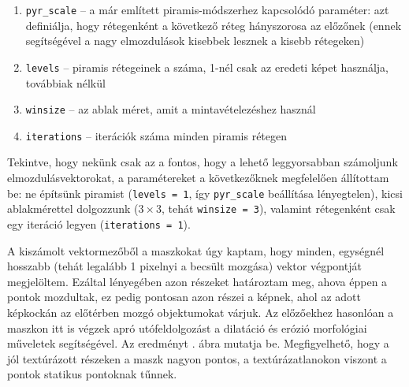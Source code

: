 \begin{enumerate}
\item \texttt{pyr\_scale} -- a már említett piramis-módszerhez kapcsolódó paraméter: azt definiálja, hogy rétegenként a következő réteg hányszorosa az előzőnek (ennek segítségével a nagy elmozdulások kisebbek lesznek a kisebb rétegeken)
\item \texttt{levels} -- piramis rétegeinek a száma, 1-nél csak az eredeti képet használja, továbbiak nélkül
\item \texttt{winsize} -- az ablak méret, amit a mintavételezéshez használ
\item \texttt{iterations} -- iterációk száma minden piramis rétegen
\end{enumerate}

Tekintve, hogy nekünk csak az a fontos, hogy a lehető leggyorsabban számoljunk elmozdulásvektorokat, a paramétereket a következőknek megfelelően állítottam be: ne építsünk piramist (\texttt{levels = 1}, így \texttt{pyr\_scale} beállítása lényegtelen), kicsi ablakmérettel dolgozzunk ($3\times 3$, tehát \texttt{winsize = 3}), valamint rétegenként csak egy iteráció legyen (\texttt{iterations = 1}).

A kiszámolt vektormezőből a maszkokat úgy kaptam, hogy minden, egységnél hosszabb (tehát legalább 1 pixelnyi a becsült mozgása) vektor végpontját megjelöltem. Ezáltal lényegében azon részeket határoztam meg, ahova éppen a pontok mozdultak, ez pedig pontosan azon részei a képnek, ahol az adott képkockán az előtérben mozgó objektumokat várjuk. Az előzőekhez hasonlóan a maszkon itt is végzek apró utófeldolgozást a dilatáció és erózió morfológiai műveletek segítségével. Az eredményt . ábra mutatja be. Megfigyelhető, hogy a jól textúrázott részeken a maszk nagyon pontos, a textúrázatlanokon viszont a pontok statikus pontoknak tűnnek.

